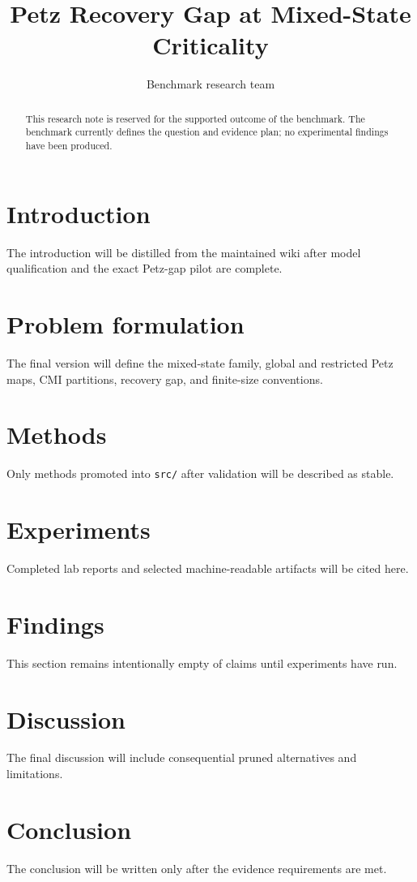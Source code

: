 \documentclass[11pt]{article}
\title{Petz Recovery Gap at Mixed-State Criticality}
\author{Benchmark research team}
\date{}
\begin{document}
\maketitle


\begin{abstract}
This research note is reserved for the supported outcome of the benchmark. The benchmark currently defines the question and evidence plan; no experimental findings have been produced.
\end{abstract}

\section{Introduction}
The introduction will be distilled from the maintained wiki after model qualification and the exact Petz-gap pilot are complete.

\section{Problem formulation}
The final version will define the mixed-state family, global and restricted Petz maps, CMI partitions, recovery gap, and finite-size conventions.

\section{Methods}
Only methods promoted into \texttt{src/} after validation will be described as stable.

\section{Experiments}
Completed lab reports and selected machine-readable artifacts will be cited here.

\section{Findings}
This section remains intentionally empty of claims until experiments have run.

\section{Discussion}
The final discussion will include consequential pruned alternatives and limitations.

\section{Conclusion}
The conclusion will be written only after the evidence requirements are met.



\end{document}
